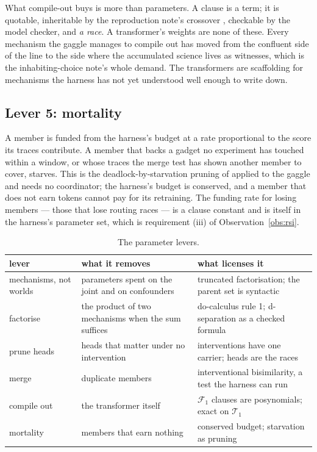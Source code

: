 \documentclass[11pt]{article}
\theoremstyle{plain}
\theoremstyle{definition}
\theoremstyle{remark}
\begin{document}
What compile-out buys is more than parameters. A clause is a term; it is
quotable, inheritable by the reproduction note's crossover \cite{Reproduction},
checkable by the model checker, and \emph{a race}. A transformer's weights are
none of these. Every mechanism the gaggle manages to compile out has moved from
the confluent side of the line to the side where the accumulated science lives
as witnesses, which is the inhabiting-choice note's whole demand. The
transformers are scaffolding for mechanisms the harness has not yet understood
well enough to write down.

\subsection{Lever 5: mortality}

A member is funded from the harness's budget at a rate proportional to the
score its traces contribute. A member that backs a gadget no experiment has
touched within a window, or whose traces the merge test has shown another member
to cover, starves. This is the deadlock-by-starvation pruning of
\cite{ProofSearch} applied to the gaggle and needs no coordinator; the harness's
budget is conserved, and a member that does not earn tokens cannot pay for its
retraining. The funding rate for losing members --- those that lose routing
races --- is a clause constant and is itself in the harness's parameter set,
which is requirement (iii) of Observation~\ref{obs:rsi}.

\begin{table}[t]
\centering\small
\begin{tabular}{@{}>{\raggedright\arraybackslash}p{}>{\raggedright\arraybackslash}p{}>{\raggedright\arraybackslash}p{}@{}}
\toprule
\textbf{lever} & \textbf{what it removes} & \textbf{what licenses it}\\
\midrule
mechanisms, not worlds & parameters spent on the joint and on confounders & truncated factorisation; the parent set is syntactic\\
factorise & the product of two mechanisms when the sum suffices & do-calculus rule 1; d-separation as a checked formula\\
prune heads & heads that matter under no intervention & interventions have one carrier; heads are the races\\
merge & duplicate members & interventional bisimilarity, a test the harness can run\\
compile out & the transformer itself & $\mathcal{F}_1$ clauses are posynomials; exact on $\mathcal{T}_1$\\
mortality & members that earn nothing & conserved budget; starvation as pruning\\
\bottomrule
\end{tabular}
\caption{The parameter levers.}\label{tab:levers}
\end{table}
\end{document}
